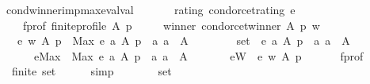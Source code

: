 \begin{isabellebody}
\isadelimdocument
%
\endisadelimdocument
%
\isatagdocument
%
\isamarkuptrue%
%
\endisatagdocument
{\isafolddocument}%
%
\isadelimdocument
%
\endisadelimdocument
{}\isamarkupfalse%
\ cond{\isacharunderscore}{\kern0pt}winner{\isacharunderscore}{\kern0pt}imp{\isacharunderscore}{\kern0pt}max{\isacharunderscore}{\kern0pt}eval{\isacharunderscore}{\kern0pt}val{\isacharcolon}{\kern0pt}\isanewline
\ \ \isanewline
\ \ \ \ rating{\isacharcolon}{\kern0pt}\ {\isachardoublequoteopen}condorcet{\isacharunderscore}{\kern0pt}rating\ e{\isachardoublequoteclose}\ \isanewline
\ \ \ \ f{\isacharunderscore}{\kern0pt}prof{\isacharcolon}{\kern0pt}\ {\isachardoublequoteopen}finite{\isacharunderscore}{\kern0pt}profile\ A\ p{\isachardoublequoteclose}\ \isanewline
\ \ \ \ winner{\isacharcolon}{\kern0pt}\ {\isachardoublequoteopen}condorcet{\isacharunderscore}{\kern0pt}winner\ A\ p\ w{\isachardoublequoteclose}\isanewline
\ \ \ {\isachardoublequoteopen}e\ w\ A\ p\ {\isacharequal}{\kern0pt}\ Max\ {\isacharbraceleft}{\kern0pt}e\ a\ A\ p\ {\isacharbar}{\kern0pt}\ a{\isachardot}{\kern0pt}\ a\ {\isasymin}\ A{\isacharbraceright}{\kern0pt}{\isachardoublequoteclose}\isanewline
%
\isadelimproof
%
\endisadelimproof
%
\isatagproof
{}\isamarkupfalse%
\ {\isacharminus}{\kern0pt}\isanewline
\ \ \isanewline
\ \ \isamarkupfalse%
\ {\isacharquery}{\kern0pt}set\ {\isacharequal}{\kern0pt}\ {\isachardoublequoteopen}{\isacharbraceleft}{\kern0pt}e\ a\ A\ p\ {\isacharbar}{\kern0pt}\ a{\isachardot}{\kern0pt}\ a\ {\isasymin}\ A{\isacharbraceright}{\kern0pt}{\isachardoublequoteclose}\ \isanewline
\ \ \ \ \ \ {\isacharquery}{\kern0pt}eMax\ {\isacharequal}{\kern0pt}\ {\isachardoublequoteopen}Max\ {\isacharbraceleft}{\kern0pt}e\ a\ A\ p\ {\isacharbar}{\kern0pt}\ a{\isachardot}{\kern0pt}\ a\ {\isasymin}\ A{\isacharbraceright}{\kern0pt}{\isachardoublequoteclose}\ \isanewline
\ \ \ \ \ \ {\isacharquery}{\kern0pt}eW\ {\isacharequal}{\kern0pt}\ {\isachardoublequoteopen}e\ w\ A\ p{\isachardoublequoteclose}\isanewline
\ \ \isanewline
\ \ \isamarkupfalse%
\ f{\isacharunderscore}{\kern0pt}prof\ \isamarkupfalse%
\ {}{\isacharcolon}{\kern0pt}\ {\isachardoublequoteopen}finite\ {\isacharquery}{\kern0pt}set{\isachardoublequoteclose}\isanewline
\ \ \ \ \isamarkupfalse%
\ simp\isanewline
\ \ \isanewline
\ \ \isamarkupfalse%
\ {}{\isacharcolon}{\kern0pt}\ {\isachardoublequoteopen}{\isacharquery}{\kern0pt}set\ {\isasymnoteq}\ {\isacharbraceleft}{\kern0pt}{\isacharbraceright}{\kern0pt}{\isachardoublequoteclose}\isanewline

\end{isabellebody}

